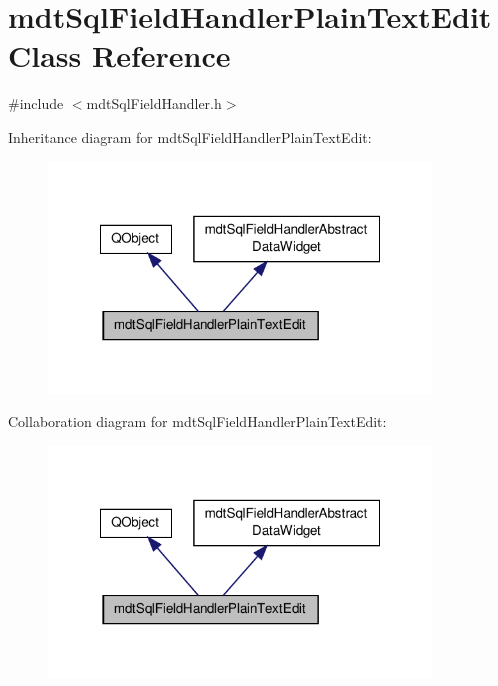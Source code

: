 \hypertarget{classmdt_sql_field_handler_plain_text_edit}{\section{mdt\-Sql\-Field\-Handler\-Plain\-Text\-Edit Class Reference}
\label{classmdt_sql_field_handler_plain_text_edit}
}


{\ttfamily \#include $<$mdt\-Sql\-Field\-Handler.\-h$>$}



Inheritance diagram for mdt\-Sql\-Field\-Handler\-Plain\-Text\-Edit\-:\nopagebreak
\begin{figure}[H]
\begin{center}
\leavevmode
\includegraphics[width=288pt]{classmdt_sql_field_handler_plain_text_edit__inherit__graph}
\end{center}
\end{figure}


Collaboration diagram for mdt\-Sql\-Field\-Handler\-Plain\-Text\-Edit\-:\nopagebreak
\begin{figure}[H]
\begin{center}
\leavevmode
\includegraphics[width=288pt]{classmdt_sql_field_handler_plain_text_edit__coll__graph}
\end{center}
\end{figure}
